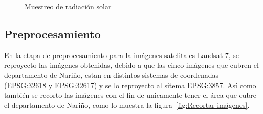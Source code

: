 \begin{figure}
  \centering
  \vfill
  \caption{Muestreo de radiación solar}
  \label{fig:3tier}
\end{figure}


\subsection{Preprocesamiento}

En la etapa de preprocesamiento para la imágenes satelitales Landsat 7, se reproyecto las imágenes obtenidas, debido a que las cinco imágenes
que cubren el departamento de Nariño, estan en distintos sistemas de coordenadas (EPSG:32618 y EPSG:32617) y se 
lo reproyecto al sitema EPSG:3857. Así como también se recorto las imágenes con el fin de unicamente tener 
el área que cubre el departamento de Nariño, como lo muestra la figura~\ref{fig:Recortar imágenes}.

